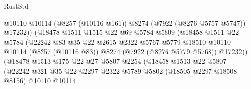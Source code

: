 \begin{lexlean}{RustStd}
\begin{coremodule}
                                        @10110
                                        @10114
                                        (@8257 (@10116 @161))
                                        @8274
                                        (@7922 (@8276 @5757 @5747))
                                        @17232))
                                    (@18478
                                      @1511
                                      @1515
                                      @22
                                      @69
                                      @5784
                                      @5809
                                      (@18458
                                        @1511
                                        @22
                                        @5784
                                        (@22242
                                          @83
                                          @35
                                          @22
                                          @2615
                                          @2322
                                          @5767
                                          @5779
                                          @18510
                                          @10110
                                          @10114
                                          (@8257 (@10116 @83))
                                          @8274
                                          (@7922 (@8276 @5779 @5768))
                                          @17232))
                                      (@18478
                                        @1513
                                        @175
                                        @22
                                        @27
                                        @5807
                                        @2254
                                        (@18458
                                          @1513
                                          @22
                                          @5807
                                          (@22242
                                            @321
                                            @35
                                            @22
                                            @2297
                                            @2322
                                            @5789
                                            @5802
                                            (@18505 @2297 @18508 @8156)
                                            @10110
                                            @10114

\end{coremodule}
\end{lexlean}
